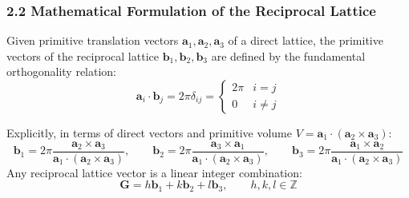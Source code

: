 \documentclass[11pt,a4paper]{article}
\begin{document}
\subsubsection{2.2 Mathematical Formulation of the Reciprocal Lattice}
Given primitive translation vectors $\mathbf{a}_1, \mathbf{a}_2, \mathbf{a}_3$ of a direct lattice, the primitive vectors of the reciprocal lattice $\mathbf{b}_1, \mathbf{b}_2, \mathbf{b}_3$ are defined by the fundamental orthogonality relation:
\begin{equation}
\mathbf{a}_i \cdot \mathbf{b}_j = 2\pi \delta_{ij} = \begin{cases} 2\pi & i = j \\ 0 & i \neq j \end{cases}
\end{equation}

Explicitly, in terms of direct vectors and primitive volume $V = \mathbf{a}_1 \cdot (\mathbf{a}_2 \times \mathbf{a}_3)$:
\begin{equation}
\mathbf{b}_1 = 2\pi \frac{\mathbf{a}_2 \times \mathbf{a}_3}{\mathbf{a}_1 \cdot (\mathbf{a}_2 \times \mathbf{a}_3)}, \qquad
\mathbf{b}_2 = 2\pi \frac{\mathbf{a}_3 \times \mathbf{a}_1}{\mathbf{a}_1 \cdot (\mathbf{a}_2 \times \mathbf{a}_3)}, \qquad
\mathbf{b}_3 = 2\pi \frac{\mathbf{a}_1 \times \mathbf{a}_2}{\mathbf{a}_1 \cdot (\mathbf{a}_2 \times \mathbf{a}_3)}
\end{equation}
Any reciprocal lattice vector is a linear integer combination:
\begin{equation}
\mathbf{G} = h\mathbf{b}_1 + k\mathbf{b}_2 + l\mathbf{b}_3, \qquad h, k, l \in \mathbb{Z}
\end{equation}
\end{document}
